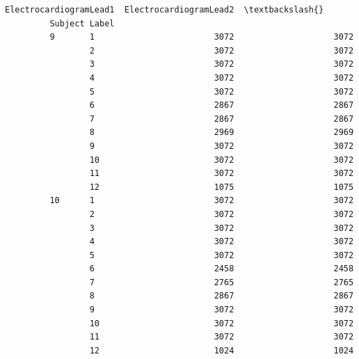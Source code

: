 \documentclass[11pt]{article}
\begin{document}
\begin{Verbatim}[commandchars=\\\{\}]
                        ElectrocardiogramLead1  ElectrocardiogramLead2  \textbackslash{}
         Subject Label                                                   
         9       1                        3072                    3072   
                 2                        3072                    3072   
                 3                        3072                    3072   
                 4                        3072                    3072   
                 5                        3072                    3072   
                 6                        2867                    2867   
                 7                        2867                    2867   
                 8                        2969                    2969   
                 9                        3072                    3072   
                 10                       3072                    3072   
                 11                       3072                    3072   
                 12                       1075                    1075   
         10      1                        3072                    3072   
                 2                        3072                    3072   
                 3                        3072                    3072   
                 4                        3072                    3072   
                 5                        3072                    3072   
                 6                        2458                    2458   
                 7                        2765                    2765   
                 8                        2867                    2867   
                 9                        3072                    3072   
                 10                       3072                    3072   
                 11                       3072                    3072   
                 12                       1024                    1024   
         

\end{Verbatim}
\end{document}
